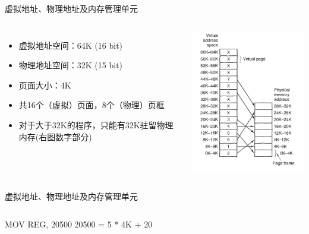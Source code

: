 \documentclass[xcolor=svgnames]{beamer}
\begin{document}
\begin{CJK*}{UTF8}{gbsn}

\begin{frame}{虚拟地址、物理地址及内存管理单元}
\begin{columns}%
\begin{itemize}
\item 虚拟地址空间：64K (16 bit)
\item 物理地址空间：32K (15 bit)
\item 页面大小：4K 
\item 共16个（虚拟）页面，8个（物理）页框
\item 对于大于32K的程序，只能有32K驻留物理内存(右图数字部分)
\end{itemize}
\includegraphics[width=1.0\textwidth]{vm.png}
\end{columns}%
\end{frame}

\begin{frame}{虚拟地址、物理地址及内存管理单元}
\begin{columns}%
\begin{block}{MOV REG, 20500}
20500 = 5 * 4K + 20 


\end{block}
\end{columns}
\end{frame}
\end{CJK*}
\end{document}
